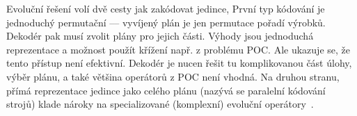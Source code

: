 Evoluční řešení volí dvě cesty jak zakódovat jedince, První typ kódování je jednoduchý permutační --– vyvíjený plán je jen permutace pořadí výrobků. Dekodér pak musí zvolit plány pro jejich části. Výhody jsou jednoduchá reprezentace a možnost použít křížení např. z problému POC. Ale ukazuje se, že tento přístup není efektivní. Dekodér je nucen řešit tu komplikovanou část úlohy, výběr plánu, a také většina operátorů z POC není vhodná.
Na druhou stranu, přímá reprezentace jedince jako celého plánu (nazývá se paralelní kódování strojů) klade nároky na specializované (komplexní) evoluční operátory~\cite{Werner:2013}.
